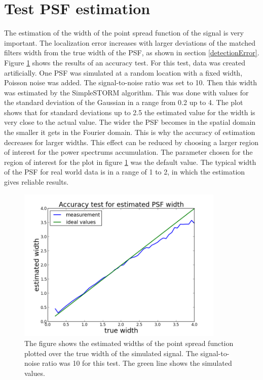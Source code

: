\section{Test PSF estimation}
The estimation of the width of the point spread function of the signal is very important. The localization error increases with larger deviations of the matched filters width from the true width of the PSF, as shown in section \ref{detectionError}. \newline
Figure \ref{estimatedSigma} shows the results of an accuracy test. For this test, data was created artificially. One PSF was simulated at a random location with a fixed width, Poisson noise was added. The signal-to-noise ratio was set to 10. Then this width was estimated by the SimpleSTORM algorithm. This was done with values for the standard deviation of the Gaussian in a range from 0.2 up to 4. The plot shows that for standard deviations up to 2.5 the estimated value for the width is very close to the actual value. The wider the PSF becomes in the spatial domain the smaller it gets in the Fourier domain. This is why the accuracy of estimation decreases for larger widths. This effect can be reduced by choosing a larger region of interest for the power spectrums accumulation. The parameter chosen for the region of interest for the plot in figure \ref{estimatedSigma} was the default value. The typical width of the PSF for real world data is in a range of 1 to 2, in which the estimation gives reliable results.\newline
\begin{figure}
\centering
\includegraphics[width = 0.88\textwidth]{pictures/AccuracyTestPSFWidth.png}
	 \caption{The figure shows the estimated widths of the point spread function plotted over the true width of the simulated signal. The signal-to-noise ratio was 10 for this test. The green line shows the simulated values.}
	\label{estimatedSigma}
\end{figure}


